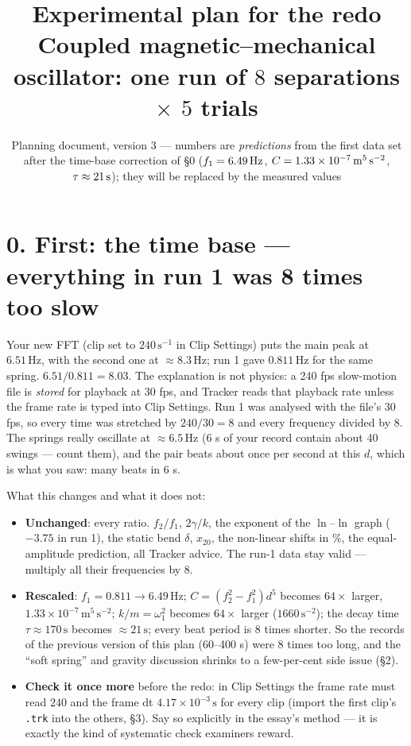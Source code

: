 \documentclass[11pt,a4paper]{article}
\title{\vspace{-1.5cm}Experimental plan for the redo\\[2pt]\large Coupled magnetic--mechanical oscillator: one run of $8$ separations $\times$ $5$ trials}
\author{}
\date{Planning document, version 3 --- numbers are \emph{predictions} from the first data set after the time-base correction of \S0 ($f_1=6.49\un{Hz}$, $C=1.33\times10^{-7}\un{m^5\,s^{-2}}$, $\tau\approx21\un{s}$); they will be replaced by the measured values}
\newcommand{\un}[1]{\,\mathrm{#1}}
\begin{document}
\maketitle
\vspace{-1.2cm}

\section*{0. First: the time base --- everything in run 1 was 8 times too slow}

Your new FFT (clip set to $240\un{s^{-1}}$ in Clip Settings) puts the main peak at $6.51\un{Hz}$, with the second one at $\approx8.3\un{Hz}$; run 1 gave $0.811\un{Hz}$ for the same spring. $6.51/0.811=8.03$. The explanation is not physics: a 240 fps slow-motion file is \emph{stored} for playback at 30 fps, and Tracker reads that playback rate unless the frame rate is typed into Clip Settings. Run 1 was analysed with the file's 30 fps, so every time was stretched by $240/30=8$ and every frequency divided by 8. The springs really oscillate at $\approx6.5\un{Hz}$ (6 s of your record contain about 40 swings --- count them), and the pair beats about once per second at this $d$, which is what you saw: many beats in 6 s.

What this changes and what it does not:
\begin{itemize}[leftmargin=1.6em,itemsep=1pt]
\item \textbf{Unchanged}: every ratio. $f_2/f_1$, $2\gamma/k$, the exponent of the $\ln$--$\ln$ graph ($-3.75$ in run 1), the static bend $\delta$, $x_{20}$, the non-linear shifts in \%, the equal-amplitude prediction, all Tracker advice. The run-1 data stay valid --- multiply all their frequencies by 8.
\item \textbf{Rescaled}: $f_1=0.811\to6.49\un{Hz}$; $C=(f_2^2-f_1^2)d^5$ becomes $64\times$ larger, $1.33\times10^{-7}\un{m^5\,s^{-2}}$; $k/m=\omega_1^2$ becomes $64\times$ larger ($1660\un{s^{-2}}$); the decay time $\tau\approx170\un{s}$ becomes $\approx21\un{s}$; every beat period is 8 times shorter. So the records of the previous version of this plan (60--400 s) were 8 times too long, and the ``soft spring'' and gravity discussion shrinks to a few-per-cent side issue (\S2).
\item \textbf{Check it once more} before the redo: in Clip Settings the frame rate must read $240$ and the frame dt $4.17\times10^{-3}\un{s}$ for every clip (import the first clip's \texttt{.trk} into the others, \S3). Say so explicitly in the essay's method --- it is exactly the kind of systematic check examiners reward.
\end{itemize}
\end{document}
